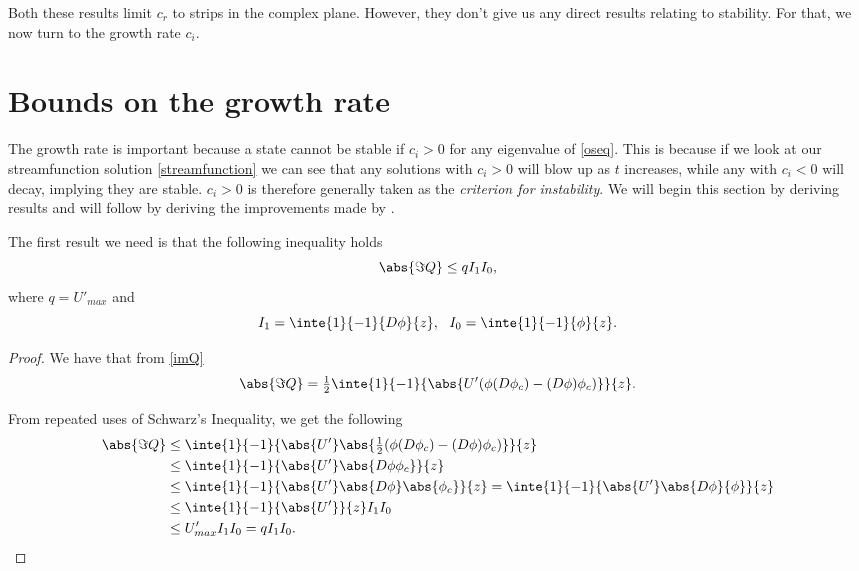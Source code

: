 Both these results limit $ c_r $ to strips in the complex plane. However, they don't give us any direct results relating to stability. For that, we now turn to the growth rate $ c_i $.

\section{Bounds on the growth rate}

The growth rate is important because a state cannot be stable if $ c_i > 0 $ for any eigenvalue of \eqref{oseq}. This is because if we look at our streamfunction solution \eqref{streamfunction} we can see that any solutions with $ c_i > 0 $ will blow up as $ t $ increases, while any with $ c_i < 0$ will decay, implying they are stable. $ c_i > 0 $ is therefore generally taken as the \emph{criterion for instability}. We will begin this section by deriving \citet{synge1938hydrodynamical} results and will follow by deriving the improvements made by \cite{joseph1968eigenvalue, joseph1969eigenvalue}.

The first result we need is that the following inequality holds
\begin{equation}
    \abs{\Im{Q}} \leq q I_1 I_0,
\end{equation}
where $ q = U'_{max}$ and
\begin{equation}
    I_1 = \inte{1}{-1}{D \phi}{z},\ \ I_0 = \inte{1}{-1}{\phi}{z}.
\end{equation}

\begin{proof}
We have that from \eqref{imQ}
\begin{equation}
    \abs{\Im{Q}} = \tfrac{1}{2} \inte{1}{-1}{\abs{U' ( \phi ( D \phi_c) - (D \phi) \phi_c)}}{z}.
\end{equation}

From repeated uses of Schwarz's Inequality, we get the following
\begin{align}
    \abs{\Im{Q}} &\leq \inte{1}{-1}{\abs{U'} \abs{\tfrac{1}{2} ( \phi (D \phi_c) - (D \phi) \phi_c)}}{z} \nonumber\\
    &\leq \inte{1}{-1}{\abs{U'} \abs{D \phi \phi_c}}{z} \nonumber\\
    &\leq \inte{1}{-1}{\abs{U'} \abs{D \phi} \abs{\phi_c}}{z} = \inte{1}{-1}{\abs{U'} \abs{D \phi}{\phi}}{z} \nonumber\\
    &\leq \inte{1}{-1}{\abs{U'}}{z} I_1 I_0 \nonumber\\
    &\leq U'_{max} I_1 I_0 = q I_1 I_0.
\end{align}
\end{proof} 

